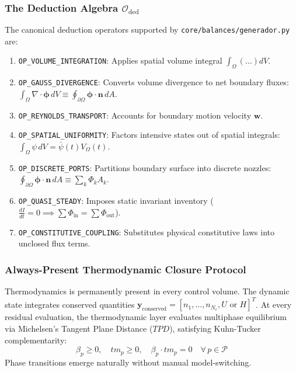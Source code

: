 \documentclass[11pt,a4paper]{article}
\begin{document}
\subsubsection{The Deduction Algebra $\mathcal{O}_{\text{ded}}$}
The canonical deduction operators supported by \texttt{core/balances/generador.py} are:
\begin{enumerate}[leftmargin=*]
    \item \texttt{OP\_VOLUME\_INTEGRATION}: Applies spatial volume integral $\int_\Omega (\dots) dV$.
    \item \texttt{OP\_GAUSS\_DIVERGENCE}: Converts volume divergence to net boundary fluxes: $\int_\Omega \nabla \cdot \boldsymbol{\phi} \, dV \equiv \oint_{\partial\Omega} \boldsymbol{\phi} \cdot \mathbf{n} \, dA$.
    \item \texttt{OP\_REYNOLDS\_TRANSPORT}: Accounts for boundary motion velocity $\mathbf{w}$.
    \item \texttt{OP\_SPATIAL\_UNIFORMITY}: Factors intensive states out of spatial integrals: $\int_\Omega \psi \, dV = \bar{\psi}(t) V_\Omega(t)$.
    \item \texttt{OP\_DISCRETE\_PORTS}: Partitions boundary surface into discrete nozzles: $\oint_{\partial\Omega} \boldsymbol{\phi} \cdot \mathbf{n} \, dA \equiv \sum_k \Phi_k A_k$.
    \item \texttt{OP\_QUASI\_STEADY}: Imposes static invariant inventory ($\frac{d I}{dt} = 0 \implies \sum \Phi_{\text{in}} = \sum \Phi_{\text{out}}$).
    \item \texttt{OP\_CONSTITUTIVE\_COUPLING}: Substitutes physical constitutive laws into unclosed flux terms.
\end{enumerate}

\subsubsection{Always-Present Thermodynamic Closure Protocol}
Thermodynamics is permanently present in every control volume. The dynamic state integrates conserved quantities $\mathbf{y}_{\text{conserved}} = [n_1, \dots, n_{N_c}, U \text{ or } H]^T$. At every residual evaluation, the thermodynamic layer evaluates multiphase equilibrium via Michelsen's Tangent Plane Distance ($TPD$), satisfying Kuhn-Tucker complementarity:
\begin{equation}
\beta_p \ge 0, \quad tm_p \ge 0, \quad \beta_p \cdot tm_p = 0 \quad \forall \, p \in \mathcal{P}
\end{equation}
Phase transitions emerge naturally without manual model-switching.
\end{document}
